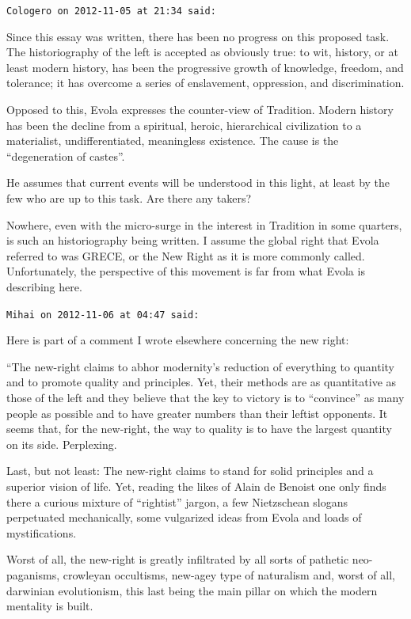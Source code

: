 \begin{footnotesize}
\begin{sffamily}
\texttt{Cologero on 2012-11-05 at 21:34 said:}

Since this essay was written, there has been no progress on this proposed task. The historiography of the left is accepted as obviously true: to wit, history, or at least modern history, has been the progressive growth of knowledge, freedom, and tolerance; it has overcome a series of enslavement, oppression, and discrimination.

Opposed to this, Evola expresses the counter-view of Tradition. Modern history has been the decline from a spiritual, heroic, hierarchical civilization to a materialist, undifferentiated, meaningless existence. The cause is the ``degeneration of castes''.

He assumes that current events will be understood in this light, at least by the few who are up to this task. Are there any takers?

Nowhere, even with the micro-surge in the interest in Tradition in some quarters, is such an historiography being written. I assume the global right that Evola referred to was GRECE, or the New Right as it is more commonly called. Unfortunately, the perspective of this movement is far from what Evola is describing here.

\hfill

\texttt{Mihai on 2012-11-06 at 04:47 said:}

Here is part of a comment I wrote elsewhere concerning the new right:

``The new-right claims to abhor modernity's reduction of everything to quantity and to promote quality and principles. Yet, their methods are as quantitative as those of the left and they believe that the key to victory is to ``convince'' as many people as possible and to have greater numbers than their leftist opponents. It seems that, for the new-right, the way to quality is to have the largest quantity on its side. Perplexing.

Last, but not least: The new-right claims to stand for solid principles and a superior vision of life. Yet, reading the likes of Alain de Benoist one only finds there a curious mixture of ``rightist'' jargon, a few Nietzschean slogans perpetuated mechanically, some vulgarized ideas from Evola and loads of mystifications.

Worst of all, the new-right is greatly infiltrated by all sorts of pathetic neo-paganisms, crowleyan occultisms, new-agey type of naturalism and, worst of all, darwinian evolutionism, this last being the main pillar on which the modern mentality is built.


\end{sffamily}
\end{footnotesize}
